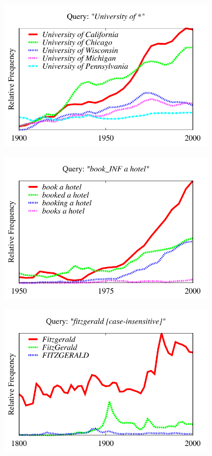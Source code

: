 \documentclass[11pt,a4paper]{article}
\begin{document}
\begin{figure}[!t]
\begin{subfigure}
  \centering
\includegraphics[width=\columnwidth]{graphs/university}\\
\end{subfigure}%
\begin{subfigure}
\centering
\includegraphics[width=\columnwidth]{graphs/book}\\
\end{subfigure}%
\begin{subfigure}
\centering
\includegraphics[width=\columnwidth]{graphs/fitzgerald}\\

\end{subfigure}
\end{figure}
\end{document}
